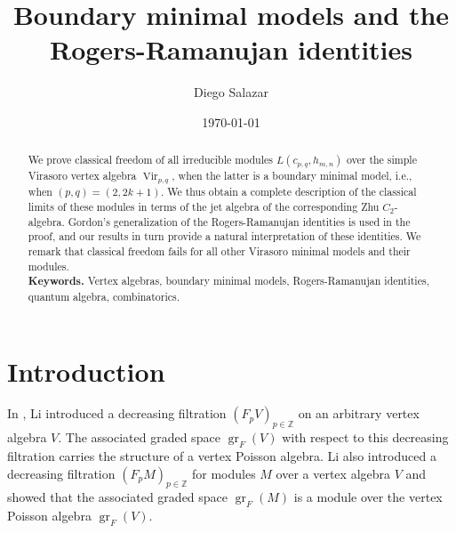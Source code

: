 \documentclass[a4paper, 12pt, reqno]{amsart}
\theoremstyle{remark}
\DeclareMathOperator{\Vir}{Vir}
\DeclareMathOperator{\gr}{gr}
\begin{document}
\setcounter{section}{-1}

\begin{abstract}
We prove classical freedom of all irreducible modules $L(c_{p, q}, h_{m, n})$ over the simple Virasoro vertex algebra $\Vir_{p, q}$, when the latter is a boundary minimal model, i.e., when $(p, q) = (2, 2k+1)$. We thus obtain a complete description of the classical limits of these modules in terms of the jet algebra of the corresponding Zhu $C_2$-algebra. Gordon's generalization of the Rogers-Ramanujan identities is used in the proof, and our results in turn provide a natural interpretation of these identities. We remark that classical freedom fails for all other Virasoro minimal models and their modules. \\
  \smallskip
  \noindent \textbf{Keywords.} Vertex algebras, boundary minimal models, Rogers-Ramanujan identities, quantum algebra, combinatorics.
\end{abstract}

\title{Boundary minimal models and the Rogers-Ramanujan identities}
\author{Diego Salazar}
\address{Instituto de Matemática Pura e Aplicada, Rio de Janeiro, RJ, Brazil}
\date{\today}
\maketitle


\section{Introduction}
\label{sec:introduction}

In \cite{li_abelianizing_2005}, Li introduced a decreasing filtration $(F_pV)_{p \in \mathbb{Z}}$ on an arbitrary vertex algebra $V$.
The associated graded space $\gr_F(V)$ with respect to this decreasing filtration carries the structure of a vertex Poisson algebra.
Li also introduced a decreasing filtration $(F_pM)_{p \in \mathbb{Z}}$ for modules $M$ over a vertex algebra $V$ and showed that the associated graded space $\gr_F(M)$ is a module over the vertex Poisson algebra $\gr_F(V)$.

\end{document}
